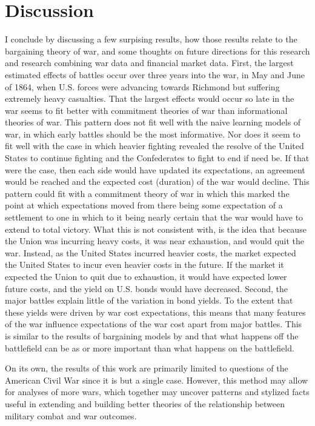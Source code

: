 \section{Discussion}
\label{sec:conclusion}

I conclude by discussing a few surpising results, how those results relate to the bargaining theory of war, and some thoughts on future directions for this research and research combining war data and financial market data.
First, the largest estimated effects of battles occur over three years into the war, in May and June of 1864, when U.S. forces were advancing towards Richmond but suffering extremely heavy casualties.
That the largest effects would occur so late in the war seems to fit better with commitment theories of war than informational theories of war.
This pattern does not fit well with the naive learning models of war, in which early battles should be the most informative.
Nor does it seem to fit well with the case in which heavier fighting revealed the resolve of the United States to continue fighting and the Confederates to fight to end if need be.
If that were the case, then each side would have updated its expectations, an agreement would be reached and the expected cost (duration) of the war would decline.
This pattern could fit with a commitment theory of war in which this marked the point at which expectations moved from there being some expectation of a settlement to one in which to it being nearly certain that the war would have to extend to total victory.
What this is not consistent with, is the idea that because the Union was incurring heavy costs, it was near exhaustion, and would quit the war.
Instead, as the United States incurred heavier costs, the market expected the United States to incur even heavier costs in the future.
If the market it expected the Union to quit due to exhaustion, it would have expected lower future costs, and the yield on U.S. bonds would have decreased.
Second, the major battles explain little of the variation in bond yields.
To the extent that these yields were driven by war cost expectations, this means that many features of the war influence expectations of the war cost apart from major battles.
This is similar to the results of bargaining models by \textcite{Powell2004} and \textcite{Slantchev2003} that what happens off the battlefield can be as or more important than what happens on the battlefield.

On its own, the results of this work are primarily limited to questions of the American Civil War since it is but a single case.
However, this method may allow for analyses of more wars, which together may uncover patterns and stylized facts useful in extending and building better theories of the relationship between military combat and war outcomes.

